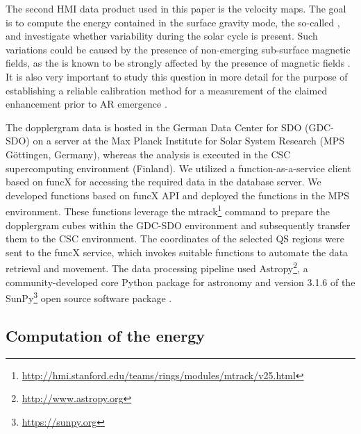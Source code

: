 \documentclass{aa}
\begin{document}
The second HMI data product used in this paper is the \los{} velocity maps. The goal is to compute the 
energy contained in the
surface gravity mode, the so-called \fffns,
and investigate whether variability during the solar cycle is present. Such variations could be caused by the presence of non-emerging sub-surface magnetic fields, as the \fff is known
to be strongly affected by the presence of magnetic fields \citep[see, e.g.,][]{Cally+94,CB97,SRB16}. 
It is also very important to study this question in more detail for the purpose of establishing a reliable calibration method 
for a measurement of
the claimed 
\fff enhancement prior to AR emergence \cite{SRB16,Waidele22}. 

The dopplergram data is hosted in the German Data Center for SDO (GDC-SDO) on a server at the Max Planck Institute for Solar System Research (MPS Göttingen, Germany), whereas the analysis is executed in the CSC supercomputing environment (Finland). We utilized  a function-as-a-service client based on funcX \cite[]{chard20funcx} for accessing the required data in the database server. We developed functions based on funcX API and deployed the functions in the MPS environment. These functions leverage the mtrack\footnote{\url{http://hmi.stanford.edu/teams/rings/modules/mtrack/v25.html}} command to prepare the dopplergram cubes within the GDC-SDO environment and subsequently transfer them to the CSC environment. The coordinates of the selected 
QS
regions were sent to the funcX service, which invokes suitable functions to automate the data retrieval and movement.
The data processing pipeline used Astropy\footnote{\url{http://www.astropy.org}}, a community-developed core Python package for astronomy \citep{astropy13, astropy18} and version 3.1.6 of the SunPy\footnote{\url{https://sunpy.org}} open source software package \cite[]{sunpy20}.

\subsection{Computation of the \fff
energy}
\end{document}
